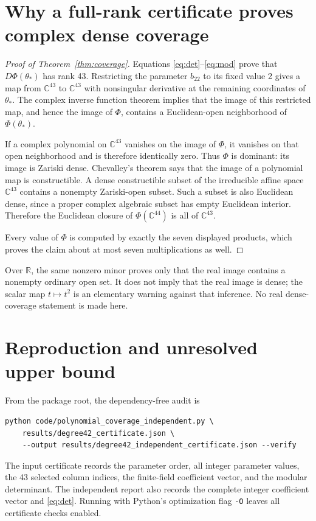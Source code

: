 \documentclass[11pt]{article}
\newcommand{\C}{\mathbb C}
\newcommand{\R}{\mathbb R}
\begin{document}
\section{Why a full-rank certificate proves complex dense coverage}
\begin{proof}[Proof of Theorem~\ref{thm:coverage}]
Equations \eqref{eq:det}--\eqref{eq:mod} prove that $D\Phi(\theta_*)$ has rank 43. Restricting the parameter $b_{22}$ to its fixed value 2 gives a map from $\C^{43}$ to $\C^{43}$ with nonsingular derivative at the remaining coordinates of $\theta_*$. The complex inverse function theorem implies that the image of this restricted map, and hence the image of $\Phi$, contains a Euclidean-open neighborhood of $\Phi(\theta_*)$.

If a complex polynomial on $\C^{43}$ vanishes on the image of $\Phi$, it vanishes on that open neighborhood and is therefore identically zero. Thus $\Phi$ is dominant: its image is Zariski dense. Chevalley's theorem says that the image of a polynomial map is constructible. A dense constructible subset of the irreducible affine space $\C^{43}$ contains a nonempty Zariski-open subset. Such a subset is also Euclidean dense, since a proper complex algebraic subset has empty Euclidean interior. Therefore the Euclidean closure of $\Phi(\C^{44})$ is all of $\C^{43}$.

Every value of $\Phi$ is computed by exactly the seven displayed products, which proves the claim about at most seven multiplications as well.
\end{proof}

Over $\R$, the same nonzero minor proves only that the real image contains a nonempty ordinary open set. It does not imply that the real image is dense; the scalar map $t\mapsto t^2$ is an elementary warning against that inference. No real dense-coverage statement is made here.

\section{Reproduction and unresolved upper bound}
From the package root, the dependency-free audit is
\begin{verbatim}
python code/polynomial_coverage_independent.py \
    results/degree42_certificate.json \
    --output results/degree42_independent_certificate.json --verify
\end{verbatim}
The input certificate records the parameter order, all integer parameter values, the 43 selected column indices, the finite-field coefficient vector, and the modular determinant. The independent report also records the complete integer coefficient vector and \eqref{eq:det}. Running with Python's optimization flag \texttt{-O} leaves all certificate checks enabled.
\end{document}
